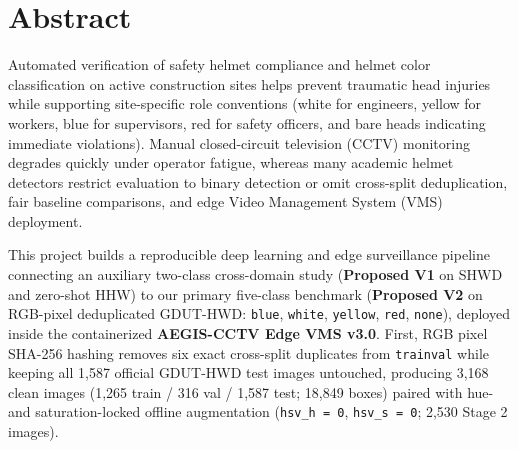 \clearpage
{}
\listoffigures

\clearpage
{}
\tableofcontents

\clearpage
\section*{Abstract}
\begingroup{}\setlength{\parskip}{4pt}

Automated verification of safety helmet compliance and helmet color classification on active construction sites helps prevent traumatic head injuries while supporting site-specific role conventions (white for engineers, yellow for workers, blue for supervisors, red for safety officers, and bare heads indicating immediate violations). Manual closed-circuit television (CCTV) monitoring degrades quickly under operator fatigue, whereas many academic helmet detectors restrict evaluation to binary detection or omit cross-split deduplication, fair baseline comparisons, and edge Video Management System (VMS) deployment.

This project builds a reproducible deep learning and edge surveillance pipeline connecting an auxiliary two-class cross-domain study (\textbf{Proposed V1} on SHWD and zero-shot HHW) to our primary five-class benchmark (\textbf{Proposed V2} on RGB-pixel deduplicated GDUT-HWD: \texttt{blue}, \texttt{white}, \texttt{yellow}, \texttt{red}, \texttt{none}), deployed inside the containerized \textbf{AEGIS-CCTV Edge VMS v3.0}. First, RGB pixel SHA-256 hashing removes six exact cross-split duplicates from \texttt{trainval} while keeping all 1,587 official GDUT-HWD test images untouched, producing 3,168 clean images (1,265 train / 316 val / 1,587 test; 18,849 boxes) paired with hue- and saturation-locked offline augmentation (\texttt{hsv\_h = 0}, \texttt{hsv\_s = 0}; 2,530 Stage 2 images).

